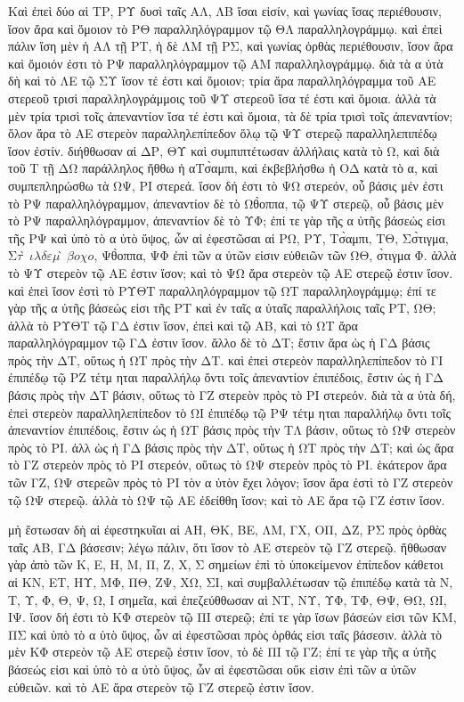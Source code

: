 \begin{Parallel}{}{}
{{\greekfont Καὶ ἐπεὶ δύο αἱ ΤΡ, ΡΥ δυσὶ ταῖς ΑΛ,
ΛΒ ἴσαι εἰσίν, καὶ γωνίας ἴσας περιέθουσιν, ἴσον ἄρα
καὶ ὅμοιον τὸ ΡΘ παραλληλόγραμμον τῷ ΘΛ παραλληλογράμμῳ.
καὶ ἐπεὶ πάλιν ἴση μὲν ἡ ΑΛ τῇ ΡΤ, ἡ δὲ ΛΜ τῇ ΡΣ, καὶ
γωνίας ὀρθὰς περιέθουσιν, ἴσον ἄρα καὶ ὅμοιόν ἐστι
τὸ ΡΨ παραλληλόγραμμον τῷ ΑΜ παραλληλογράμμῳ. διὰ τὰ
α ὐτὰ δὴ καὶ τὸ ΛΕ τῷ ΣΥ ἴσον τέ ἐστι καὶ ὅμοιον;
τρία ἄρα παραλληλόγραμμα τοῦ ΑΕ στερεοῦ τρισὶ παραλληλογράμμοις
τοῦ ΨΥ στερεοῦ ἴσα τέ ἐστι καὶ ὅμοια. ἀλλὰ τὰ μὲν τρία
τρισὶ τοῖς ἀπεναντίον ἴσα τέ ἐστι καὶ ὅμοια, τὰ δὲ τρία τρισὶ
τοῖς ἀπεναντίον; ὅλον ἄρα τὸ ΑΕ στερεὸν παραλληλεπίπεδον
ὅλῳ τῷ ΨΥ στερεῷ παραλληλεπιπέδῳ ἴσον ἐστίν. διήθθωσαν
αἱ ΔΡ, ΘΥ καὶ συμπιπτέτωσαν ἀλλήλαις κατὰ τὸ Ω,
καὶ διὰ τοῦ Τ τῇ ΔΩ παράλληλος ἤθθω ἡ αΤσ̀αμπι,
καὶ ἐκβεβλήσθω ἡ ΟΔ κατὰ τὸ α, καὶ συμπεπληρώσθω τὰ ΩΨ, ΡΙ στερεά. ἴσον δή ἐστι τὸ ΨΩ στερεόν, οὗ βάσις μέν ἐστι τὸ
ΡΨ παραλληλόγραμμον, ἀπεναντίον
δὲ τὸ Ωθ̀οππα, τῷ ΨΥ στερεῷ, οὗ βάσις μὲν τὸ ΡΨ παραλληλόγραμμον, ἀπεναντίον δὲ τὸ ΥΦ; ἐπί τε γὰρ τῆς α ὐτῆς
βάσεώς εἰσι τῆς ΡΨ καὶ ὑπὸ τὸ α ὐτὸ ὕψος, ὧν αἱ
ἐφεστῶσαι αἱ ΡΩ, ΡΥ, Τσ̀αμπι, ΤΘ, Σσ̀τιγμα, Σ$τ̀ιλδε{μ̀βοχ{ο}}$, Ψθ̀οππα,
ΨΦ ἐπὶ τῶν α ὐτῶν εἰσιν εὐθειῶν τῶν ΩΘ, σ̀τιγμα Φ. ἀλλὰ
τὸ ΨΥ στερεὸν τῷ ΑΕ ἐστιν ἴσον; καὶ τὸ ΨΩ ἄρα στερεὸν τῷ
ΑΕ στερεῷ ἐστιν ἴσον. καὶ ἐπεὶ ἴσον ἐστὶ τὸ ΡΥΘΤ
παραλληλόγραμμον τῷ ΩΤ παραλληλογράμμῳ; ἐπί τε γὰρ τῆς
α ὐτῆς βάσεώς εἰσι τῆς ΡΤ καὶ ἐν ταῖς α ὐταῖς
παραλλήλοις ταῖς ΡΤ, ΩΘ; ἀλλὰ τὸ ΡΥΘΤ τῷ ΓΔ ἐστιν ἴσον,
ἐπεὶ καὶ τῷ ΑΒ, καὶ τὸ ΩΤ ἄρα παραλληλόγραμμον τῷ ΓΔ
ἐστιν ἴσον. ἄλλο δὲ τὸ ΔΤ; ἔστιν ἄρα ὡς ἡ ΓΔ βάσις
πρὸς τὴν ΔΤ, οὕτως ἡ ΩΤ πρὸς τὴν ΔΤ. καὶ ἐπεὶ
στερεὸν παραλληλεπίπεδον τὸ ΓΙ ἐπιπέδῳ τῷ ΡΖ  τέτμ ηται παραλλήλῳ
ὄντι τοῖς ἀπεναντίον ἐπιπέδοις, ἔστιν ὡς ἡ ΓΔ βάσις
πρὸς τὴν ΔΤ βάσιν, οὕτως τὸ ΓΖ στερεὸν πρὸς τὸ ΡΙ
στερεόν. διὰ τὰ α ὐτὰ δή, ἐπεὶ στερεὸν παραλληλεπίπεδον τὸ ΩΙ
ἐπιπέδῳ τῷ ΡΨ τέτμ ηται παραλλήλῳ ὄντι τοῖς ἀπεναντίον
ἐπιπέδοις, ἔστιν ὡς ἡ ΩΤ βάσις πρὸς τὴν ΤΛ βάσιν, οὕτως
τὸ ΩΨ
στερεὸν πρὸς τὸ ΡΙ. ἀλλ ὡς ἡ ΓΔ
βάσις πρὸς τὴν ΔΤ, οὕτως ἡ ΩΤ πρὸς τὴν ΔΤ; καὶ
ὡς ἄρα τὸ ΓΖ στερεὸν πρὸς τὸ ΡΙ στερεόν, οὕτως τὸ ΩΨ
στερεὸν πρὸς τὸ ΡΙ. ἑκάτερον ἄρα τῶν ΓΖ, ΩΨ στερεῶν πρὸς τὸ ΡΙ
τὸν α ὐτὸν ἔχει λόγον; ἴσον ἄρα ἐστὶ τὸ ΓΖ στερεὸν
τῷ ΩΨ στερεῷ. ἀλλὰ τὸ ΩΨ τῷ ΑΕ ἐδείθθη ἴσον; καὶ τὸ ΑΕ
ἄρα τῷ ΓΖ ἐστιν ἴσον.}\\

\epsfysize=1.8in
\centerline{}

{\greekfont μὴ ἔστωσαν δὴ αἱ ἐφεστηκυῖαι αἱ ΑΗ, ΘΚ, ΒΕ, ΛΜ, ΓΧ, ΟΠ,
ΔΖ, ΡΣ πρὸς ὀρθὰς ταῖς ΑΒ, ΓΔ βάσεσιν; λέγω πάλιν, ὅτι
ἵσον τὸ ΑΕ στερεὸν τῷ ΓΖ στερεῷ. ἤθθωσαν γὰρ ἀπὸ τῶν Κ,
Ε, Η, Μ, Π, Ζ, Χ, Σ σημείων ἐπὶ τὸ ὑποκείμενον ἐπίπεδον κάθετοι
αἱ ΚΝ, ΕΤ, ΗΥ, ΜΦ, ΠΘ, ΖΨ, ΧΩ, ΣΙ, καὶ συμβαλλέτωσαν τῷ ἐπιπέδῳ
κατὰ τὰ Ν, Τ, Υ, Φ, Θ, Ψ, Ω, Ι σημεῖα, καὶ ἐπεζεύθθωσαν αἱ ΝΤ, ΝΥ,
ΥΦ, ΤΦ, ΘΨ, ΘΩ, ΩΙ, ΙΨ. ἴσον δή ἐστι τὸ ΚΦ στερεὸν τῷ ΠΙ
στερεῷ; ἐπί τε γὰρ ἴσων βάσεών εἰσι τῶν ΚΜ, ΠΣ καὶ
ὑπὸ τὸ α ὐτὸ ὕψος, ὧν αἱ ἐφεστῶσαι πρὸς ὀρθάς
εἰσι ταῖς βάσεσιν. ἀλλὰ τὸ μὲν ΚΦ στερεὸν τῷ ΑΕ στερεῷ
ἐστιν ἴσον, τὸ δὲ ΠΙ τῷ ΓΖ; ἐπί τε γὰρ τῆς α ὐτῆς βάσεώς
εἰσι καὶ ὑπὸ τὸ α ὐτὸ ὕψος, ὧν αἱ ἐφεστῶσαι οὔκ εἰσιν
ἐπὶ τῶν α ὐτῶν εὐθειῶν. καὶ τὸ ΑΕ ἄρα στερεὸν τῷ
ΓΖ στερεῷ ἐστιν ἴσον.}

}
\end{Parallel}
